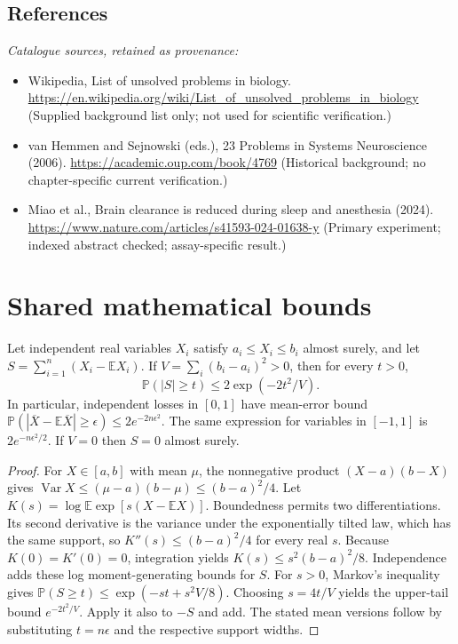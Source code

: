 \documentclass[11pt]{article}
\begin{document}
\subsection{References}
\noindent\emph{Catalogue sources, retained as provenance:}
\begin{itemize}
\item Wikipedia, List of unsolved problems in biology. \url{https://en.wikipedia.org/wiki/List_of_unsolved_problems_in_biology} (Supplied background list only; not used for scientific verification.)
\item van Hemmen and Sejnowski (eds.), 23 Problems in Systems Neuroscience (2006). \url{https://academic.oup.com/book/4769} (Historical background; no chapter-specific current verification.)
\item Miao et al., Brain clearance is reduced during sleep and anesthesia (2024). \url{https://www.nature.com/articles/s41593-024-01638-y} (Primary experiment; indexed abstract checked; assay-specific result.)
\end{itemize}




\section{Shared mathematical bounds}\label{app:bounds}
\begin{lemma}\label{lem:bounded}
Let independent real variables $X_i$ satisfy $a_i\leq X_i\leq b_i$ almost surely,
and let $S=\sum_{i=1}^n(X_i-\mathbb{E} X_i)$. If
$V=\sum_i(b_i-a_i)^2>0$, then for every $t>0$,
\[
 \mathbb{P}(|S|\geq t)\leq 2\exp(-2t^2/V).
\]
In particular, independent losses in $[0,1]$ have mean-error bound
$\mathbb{P}(|\overline X-\mathbb{E}\overline X|\geq\epsilon)
\leq2e^{-2n\epsilon^2}$. The same expression for variables in $[-1,1]$
is $2e^{-n\epsilon^2/2}$. If $V=0$ then $S=0$ almost surely.
\end{lemma}
\begin{proof}
For $X\in[a,b]$ with mean $\mu$, the nonnegative product
$(X-a)(b-X)$ gives
$\operatorname{Var} X\leq(\mu-a)(b-\mu)\leq(b-a)^2/4$.
Let $K(s)=\log\mathbb{E}\exp[s(X-\mathbb{E} X)]$.
Boundedness permits two differentiations. Its second derivative is the variance
under the exponentially tilted law, which has the same support, so
$K''(s)\leq(b-a)^2/4$ for every real $s$.
Because $K(0)=K'(0)=0$, integration yields
$K(s)\leq s^2(b-a)^2/8$.
Independence adds these log moment-generating bounds for $S$.
For $s>0$, Markov's inequality gives
$\mathbb{P}(S\geq t)\leq\exp(-st+s^2V/8)$.
Choosing $s=4t/V$ yields the upper-tail bound $e^{-2t^2/V}$.
Apply it also to $-S$ and add. The stated mean versions follow by substituting
$t=n\epsilon$ and the respective support widths.
\end{proof}
\end{document}
